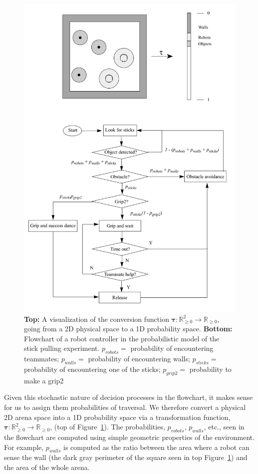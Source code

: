 \documentclass[Main.tex]{subfiles}
\begin{document}
\begin{figure}[!tp]
\centering\includegraphics[width=12.5cm]{assets/stickprobcontrol.png}
\centering\caption{\textbf{Top:} A visualization of the conversion function $\boldsymbol{\tau}:\mathbb{R}^2_{\geq0} \rightarrow \mathbb{R}_{\geq0}$, going from a 2D physical space to a 1D probability space. \textbf{Bottom:} Flowchart of a robot controller in the probabilistic model of the stick pulling experiment. $p_{robots} =$ probability of encountering teammates; $p_{walls} =$ probability of encountering walls; $p_{sticks} =$ probability of encountering one of the sticks; $p_{grip2} =$ probability to make a grip2} \label{fig:probstickchart}
\end{figure}

Given this stochastic nature of decision processes in the flowchart, it makes sense for us to assign them probabilities of traversal. We therefore convert a physical 2D arena space into a 1D probability space via a transformation function, $\boldsymbol{\tau}:\mathbb{R}^2_{\geq0} \rightarrow \mathbb{R}_{\geq0}$, (top of Figure~\ref{fig:probstickchart}). The probabilities, $p_{robots}$, $p_{walls}$, etc., seen in the flowchart are computed using simple geometric properties of the environment. For example, $p_{walls}$ is computed as the ratio between the area where a robot can sense the wall (the dark gray perimeter of the square seen in top Figure~\ref{fig:probstickchart}) and the area of the whole arena.
\end{document}
